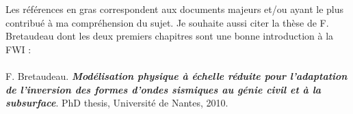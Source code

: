 \documentclass[]{article}
\begin{document}







%
%
%	
%

\newpage

%


\vfill
Les références en gras correspondent aux documents majeurs et/ou ayant le plus contribué à ma compréhension du sujet. Je souhaite aussi citer la thèse de F. Bretaudeau dont les deux premiers chapitres sont une bonne introduction à la FWI : \\~\\
F. Bretaudeau. \textbf{\emph{Modélisation physique à échelle réduite pour l’adaptation de l’inversion des formes d’ondes sismiques au génie civil et à la subsurface}}. PhD thesis, Université de Nantes, 2010.
\bigskip\bigskip


\end{document}
